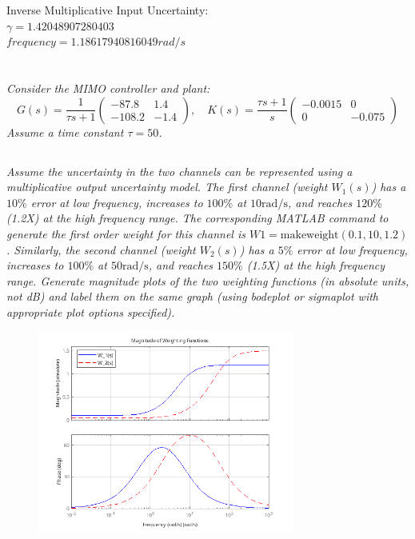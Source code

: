 \documentclass{article}
\begin{document}
Inverse Multiplicative Input Uncertainty: \\
$\gamma = 1.42048907280403$ \\ 
$frequency = 1.18617940816049 rad/s$ \\

\section{}
\textit{Consider the MIMO controller and plant:
\[
G(s)=\frac{1}{\tau s+1}\left(\begin{array}{cc}
-87.8 & 1.4 \\
-108.2 & -1.4
\end{array}\right), \quad K(s)=\frac{\tau s+1}{s}\left(\begin{array}{cc}
-0.0015 & 0 \\
0 & -0.075
\end{array}\right)
\]
Assume a time constant $\tau=50$.}

\subsection{}
\textit{Assume the uncertainty in the two channels can be represented using a multiplicative output uncertainty model. The first channel (weight $W_1(s)$) has a $10\%$ error at low frequency, increases to $100\%$ at $10 \mathrm{rad/s}$, and reaches $120\%$ (1.2X) at the high frequency range. The corresponding MATLAB command to generate the first order weight for this channel is $W1 = \text{makeweight}(0.1,10,1.2)$. Similarly, the second channel (weight $W_2(s)$) has a $5\%$ error at low frequency, increases to $100\%$ at $50 \mathrm{rad/s}$, and reaches $150\%$ (1.5X) at the high frequency range. Generate magnitude plots of the two weighting functions (in absolute units, not dB) and label them on the same graph (using bodeplot or sigmaplot with appropriate plot options specified).}

\begin{figure}[H]
    \centering
    \includegraphics[width=0.75\textwidth]{weightingFunctionsPlot.png}
    \label{fig:weightingFunctionsPlot}
\end{figure}
\end{document}
